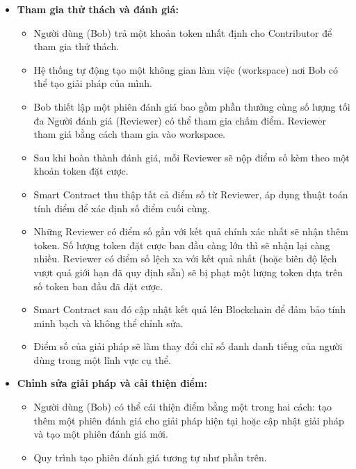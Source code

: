 \documentclass{article}[14pt]
\begin{document}
{\begin{enumerate}[label=\textbf{\alph*.}]
\begin{itemize}
                    \item \textbf{Tham gia thử thách và đánh giá:}
                    \begin{itemize}
                        \item Người dùng (Bob) trả một khoản token nhất định cho Contributor để tham gia thử thách.
                        \item Hệ thống tự động tạo một không gian làm việc (workspace) nơi Bob có thể tạo giải pháp của mình. 
                        \item Bob thiết lập một phiên đánh giá bao gồm phần thưởng cùng số lượng tối đa Người đánh giá (Reviewer) có thể tham gia chấm điểm. Reviewer tham giá bằng cách tham gia vào workspace.
                        \item Sau khi hoàn thành đánh giá, mỗi Reviewer sẽ nộp điểm số kèm theo một khoản token đặt cược.
                        \item Smart Contract thu thập tất cả điểm số từ Reviewer, áp dụng thuật toán tính điểm để xác định số điểm cuối cùng.
                        \item Những Reviewer có điểm số gần với kết quả chính xác nhất sẽ nhận thêm token. Số lượng token đặt cược ban đầu càng lớn thì sẽ nhận lại càng nhiều. Reviewer có điểm số lệch xa với kết quả nhất (hoặc biên độ lệch vượt quá giới hạn đã quy định sẵn) sẽ bị phạt một lượng token dựa trên số token ban đầu đã đặt cược.  
                        \item Smart Contract sau đó cập nhật kết quả lên Blockchain để đảm bảo tính minh bạch và không thể chỉnh sửa.
                        \item Điểm số của giải pháp sẽ làm thay đổi chỉ số danh danh tiếng của người dùng trong một lĩnh vực cụ thể.
                    \end{itemize} 

                    \item \textbf{Chỉnh sửa giải pháp và cải thiện điểm:}
                    \begin{itemize} 
                        \item Người dùng (Bob) có thể cái thiện điểm bằng một trong hai cách: tạo thêm một phiên đánh giá cho giải pháp hiện tại hoặc cập nhật giải pháp và tạo một phiên đánh giá mới.
                        \item Quy trình tạo phiên đánh giá tương tự như phần trên.
                    \end{itemize} 


\end{itemize}
\end{enumerate}}
\end{document}
